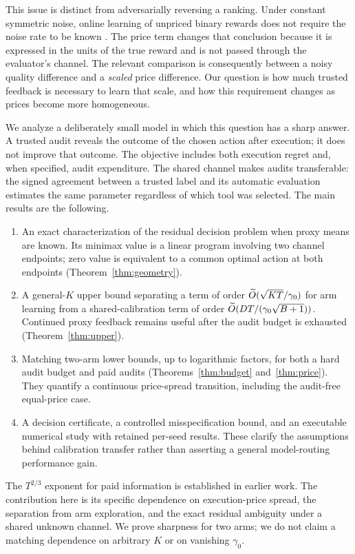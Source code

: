 This issue is distinct from adversarially reversing a ranking. Under constant symmetric noise, online learning of unpriced binary rewards does not require the noise rate to be known \citep{resler2019}. The price term changes that conclusion because it is expressed in the units of the true reward and is not passed through the evaluator's channel. The relevant comparison is consequently between a noisy quality difference and a \emph{scaled} price difference. Our question is how much trusted feedback is necessary to learn that scale, and how this requirement changes as prices become more homogeneous.

We analyze a deliberately small model in which this question has a sharp answer. A trusted audit reveals the outcome of the chosen action after execution; it does not improve that outcome. The objective includes both execution regret and, when specified, audit expenditure. The shared channel makes audits transferable: the signed agreement between a trusted label and its automatic evaluation estimates the same parameter regardless of which tool was selected. The main results are the following.
\begin{enumerate}
\item An exact characterization of the residual decision problem when proxy means are known. Its minimax value is a linear program involving two channel endpoints; zero value is equivalent to a common optimal action at both endpoints (Theorem~\ref{thm:geometry}).
\item A general-$K$ upper bound separating a term of order $\widetilde O(\sqrt{KT}/\gamma_0)$ for arm learning from a shared-calibration term of order $\widetilde O(DT/(\gamma_0\sqrt{B+1}))$. Continued proxy feedback remains useful after the audit budget is exhausted (Theorem~\ref{thm:upper}).
\item Matching two-arm lower bounds, up to logarithmic factors, for both a hard audit budget and paid audits (Theorems~\ref{thm:budget} and~\ref{thm:price}). They quantify a continuous price-spread transition, including the audit-free equal-price case.
\item A decision certificate, a controlled misspecification bound, and an executable numerical study with retained per-seed results. These clarify the assumptions behind calibration transfer rather than asserting a general model-routing performance gain.
\end{enumerate}
The $T^{2/3}$ exponent for paid information is established in earlier work. The contribution here is its specific dependence on execution-price spread, the separation from arm exploration, and the exact residual ambiguity under a shared unknown channel. We prove sharpness for two arms; we do not claim a matching dependence on arbitrary $K$ or on vanishing $\gamma_0$.

